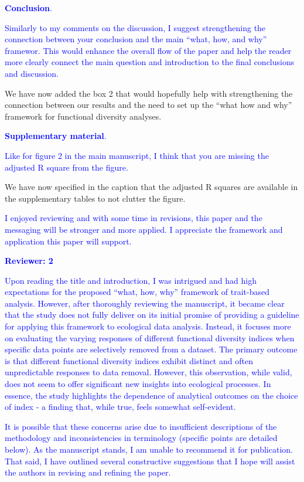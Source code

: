 \documentclass[
]{article}
\begin{document}
\textcolor{blue}{\textbf{Conclusion}.}

\textcolor{blue}{Similarly to my comments on the discussion, I suggest strengthening the connection between your conclusion and the main ``what, how, and why'' framewor.
This would enhance the overall flow of the paper and help the reader more clearly connect the main question and introduction to the final conclusions and discussion.}

We have now added the box 2 that would hopefully help with strengthening the connection between our results and the need to set up the ``what how and why'' framework for functional diversity analyses.

\textcolor{blue}{\textbf{Supplementary material}.}

\textcolor{blue}{Like for figure 2 in the main manuscript, I think that you are missing the adjusted R square from the figure.}

We have now specified in the caption that the adjusted R squares are available in the supplementary tables to not clutter the figure.

\textcolor{blue}{I enjoyed reviewing and with some time in revisions, this paper and the messaging will be stronger and more applied. I appreciate the framework and application this paper will support.}

\textcolor{blue}{\textbf{Reviewer: 2}}

\textcolor{blue}{Upon reading the title and introduction, I was intrigued and had high expectations for the proposed ``what, how, why'' framework of trait-based analysis.
However, after thoroughly reviewing the manuscript, it became clear that the study does not fully deliver on its initial promise of providing a guideline for applying this framework to ecological data analysis.
Instead, it focuses more on evaluating the varying responses of different functional diversity indices when specific data points are selectively removed from a dataset.
The primary outcome is that different functional diversity indices exhibit distinct and often unpredictable responses to data removal.
However, this observation, while valid, does not seem to offer significant new insights into ecological processes.
In essence, the study highlights the dependence of analytical outcomes on the choice of index - a finding that, while true, feels somewhat self-evident.}

\textcolor{blue}{It is possible that these concerns arise due to insufficient descriptions of the methodology and inconsistencies in terminology (specific points are detailed below).
As the manuscript stands, I am unable to recommend it for publication.
That said, I have outlined several constructive suggestions that I hope will assist the authors in revising and refining the paper.}
\end{document}
